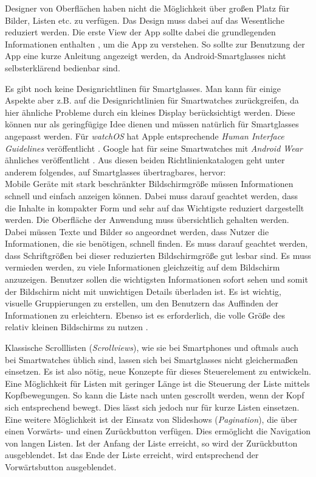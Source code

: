 Designer von Oberflächen haben nicht die Möglichkeit über großen Platz für Bilder, Listen etc. zu verfügen. Das Design muss dabei auf das Wesentliche reduziert werden. Die erste View der App sollte dabei die grundlegenden Informationen enthalten \cite[S.~442]{Tidwell2005}, um die App zu verstehen. So sollte zur Benutzung der App eine kurze Anleitung angezeigt werden, da Android-Smartglasses nicht selbsterklärend bedienbar sind.


Es gibt noch keine Designrichtlinen für Smartglasses. Man kann für einige Aspekte aber z.B. auf die Designrichtlinien für Smartwatches zurückgreifen, da hier ähnliche Probleme durch ein kleines Display berücksichtigt werden. Diese können nur als geringfügige Idee dienen und müssen natürlich für Smartglasses angepasst werden. Für \emph{watchOS} hat Apple entsprechende \emph{Human Interface Guidelines} veröffentlicht \cite{Apple2018c}. Google hat für seine Smartwatches mit \emph{Android Wear} ähnliches veröffentlicht \cite{Google2018}. Aus diesen beiden Richtlinienkatalogen geht unter anderem folgendes, auf Smartglasses übertragbares, hervor:
\\
Mobile Geräte mit stark beschränkter Bildschirmgröße  müssen Informationen schnell und einfach anzeigen können. Dabei muss darauf geachtet werden, dass die Inhalte in kompakter Form und sehr auf das Wichtigste reduziert dargestellt werden. Die Oberfläche der Anwendung muss übersichtlich gehalten werden. Dabei müssen Texte und Bilder so angeordnet werden, dass Nutzer die Informationen, die sie benötigen, schnell finden. Es muss darauf geachtet werden, dass Schriftgrößen bei dieser reduzierten Bildschirmgröße gut lesbar sind. Es muss vermieden werden, zu viele Informationen gleichzeitig auf dem Bildschirm anzuzeigen. Benutzer sollen die wichtigsten Informationen sofort sehen und somit der Bildschirm nicht mit unwichtigen Details überladen ist. Es ist wichtig, visuelle Gruppierungen zu erstellen, um den Benutzern das Auffinden der Informationen zu erleichtern. Ebenso ist es erforderlich, die volle Größe des relativ kleinen Bildschirms zu nutzen \cite{Apple2018c, Google2018}.

Klassische Scrolllisten (\emph{Scrollviews}), wie sie bei Smartphones und oftmals auch bei Smartwatches üblich sind, lassen sich bei Smartglasses nicht gleichermaßen einsetzen. Es ist also nötig, neue Konzepte für dieses Steuerelement zu entwickeln. Eine Möglichkeit für Listen mit geringer Länge ist die Steuerung der Liste mittels Kopfbewegungen. So kann die Liste nach unten gescrollt werden, wenn der Kopf sich entsprechend bewegt. Dies lässt sich jedoch nur für kurze Listen einsetzen. Eine weitere Möglichkeit ist der Einsatz von Slideshows (\emph{Pagination}), die über einen Vorwärts- und einen Zurückbutton verfügen. Dies ermöglicht die Navigation von langen Listen. Ist der Anfang der Liste erreicht, so wird der Zurückbutton ausgeblendet. Ist das Ende der Liste erreicht, wird entsprechend der Vorwärtsbutton ausgeblendet.
%
%
%
%
%
%
